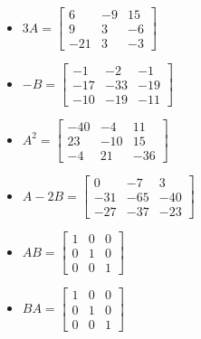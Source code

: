\begin{enumerate}
\begin{multicols}{2}
\begin{itemize}
\item  $3A = \left[ \begin{array}{rrr} 6 & -9 & 15 \\ 9 & 3 &-6 \\ -21 & 3 & -3 \end{array} \right]$

\item $-B = \left[ \begin{array}{rrr} -1 & -2 & -1 \\ -17 & -33 & -19 \\ -10 & -19 & -11 \end{array} \right]$

\end{itemize}
\end{multicols}


\begin{multicols}{2}
\begin{itemize}

\item  $A^2 = \left[ \begin{array}{rrr} -40 & -4 & 11 \\ 23 & -10 & 15 \\ -4 & 21 & -36 \end{array} \right]$

\item $A-2B = \left[ \begin{array}{rrr} 0 & -7 & 3 \\ -31 & -65 & -40 \\ -27 & -37 & -23 \end{array} \right]$


\end{itemize}
\end{multicols}

\begin{multicols}{2}
\begin{itemize}

\item $AB =  \left[ \begin{array}{rrr} 1 & 0 & 0 \\ 0 & 1 & 0 \\ 0 & 0 & 1 \end{array} \right]$

\item $BA = \left[ \begin{array}{rrr} 1 & 0 & 0 \\ 0 & 1 & 0 \\ 0 & 0 & 1 \end{array} \right]$


\end{itemize}
\end{multicols}

	
\setcounter{HW}{\value{enumi}}
\end{enumerate}

